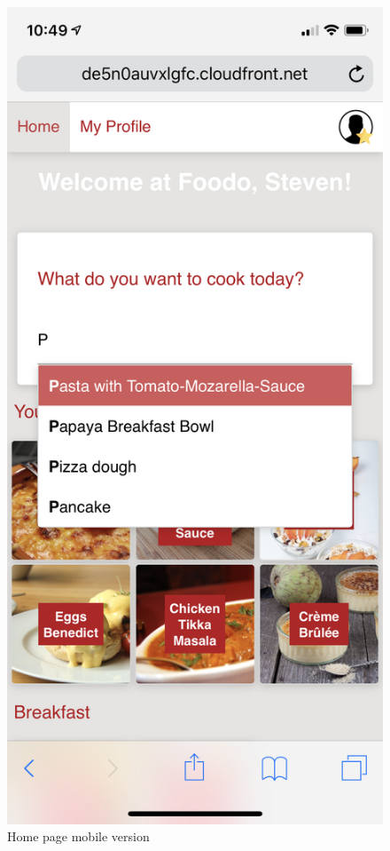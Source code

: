 \vspace{-2em}
\begin{figure}[H]
	\captionsetup{justification=centering}
	\begin{center}
		\includegraphics[scale=0.25]{Ressourcen/img/screenshots/iphoneA.png}
		\vspace{-3em}
		\caption{Home page mobile version}
	\end{center}
\end{figure}

